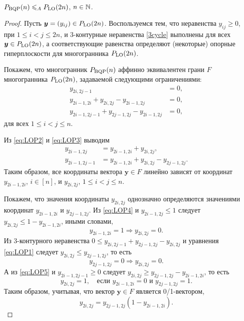 \begin{theorem}
$P_{\textup{BQP}}(n) \leqslant_A P_{\textup{LO}}(2n)$, $n\in\mathbb{N}$.
\end{theorem}
\begin{proof}
Пусть $\bm{y} = (y_{ij}) \in P_{\textup{LO}}(2n)$.
Воспользуемся тем, что неравенства $y_{ij} \ge 0$, при $1 \le i < j \le 2n$, 
и 3-контурные неравенства \eqref{3cycle} выполнены для всех $\bm{y} \in P_{\textup{LO}}(2n)$,
а соответствующие равенства определяют (некоторые) опорные гиперплоскости для многогранника $P_{\textup{LO}}(2n)$.

Покажем, что многогранник $P_{\textup{BQP}}(n)$ аффинно эквивалентен грани $F$ многогранника $P_{\textup{LO}}(2n)$, задаваемой следующими ограничениями:
\begin{align}
y_{2i, 2j-1} &= 0, \label{eq:LOP1}\\
y_{2i-1, 2i}   + y_{2i, 2j}   - y_{2i-1, 2j} &= 0, \label{eq:LOP2}\\
y_{2i-1, 2j-1} + y_{2j-1, 2j} - y_{2i-1, 2j} &= 0, \label{eq:LOP3}
\end{align}
для всех $1 \le i < j \le n$.

Из \eqref{eq:LOP2} и \eqref{eq:LOP3} выводим
\begin{align}
y_{2i-1, 2j}   &= y_{2i-1, 2i} + y_{2i, 2j}, \label{eq:LOP4}\\
y_{2i-1, 2j-1} &= y_{2i-1, 2i} + y_{2i, 2j} - y_{2j-1, 2j}. \label{eq:LOP5}
\end{align}
Таким образом, все координаты вектора $\bm{y} \in F$ линейно зависят от координат $y_{2i-1, 2i}$, $i\in[n]$, и $y_{2i, 2j}$, $1 \le i < j \le n$.

Покажем, что значения координаты $y_{2i, 2j}$ однозначно определяются значениями координат $y_{2i-1, 2i}$ и $y_{2j-1, 2j}$.
Из \eqref{eq:LOP4} и $y_{2i-1, 2j} \le 1$ следует \(y_{2i, 2j} \le 1 - y_{2i-1, 2i}\), иными словами,
\[
y_{2i-1, 2i} = 1 \Rightarrow y_{2i, 2j} = 0.
\]
Из 3-контурного неравенства $0 \le y_{2i, 2j-1} + y_{2j-1, 2j} - y_{2i, 2j}$ и уравнения \eqref{eq:LOP1} следует \(y_{2i, 2j} \le y_{2j-1, 2j}\),
то есть
\[
y_{2j-1, 2j} = 0 \Rightarrow y_{2i, 2j} = 0.
\]
А из \eqref{eq:LOP5} и $y_{2i-1, 2j-1} \ge 0$ следует \(y_{2i, 2j} \ge y_{2j-1, 2j} - y_{2i-1, 2i}\), то есть 
\[
y_{2i, 2j} = 1, \quad \text{если $y_{2i-1, 2i} = 0$  и $y_{2j-1, 2j} = 1$}.
\]
Таким образом, учитывая, что вектор $\bm{y}\in F$ является 0/1-вектором,
\begin{equation}
\label{eq:LOPbqp}
y_{2i, 2j} = y_{2j-1, 2j} (1 - y_{2i-1, 2i}).
\end{equation}


\end{proof}
